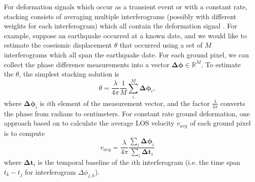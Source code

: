For deformation signals which occur as a transient event 
or with a constant rate, stacking consists of averaging multiple interferograms (possibly with different weights for each interferogram) which all contain the deformation signal \citep{Simons2007InterferometricSyntheticAperture, Zheng2019ImagingCascadiaSlow}. 
For example, suppose an earthquake occurred at a known date, and we would like to estimate the coseismic displacement $\theta$ that occurred using a set of $M$ interferograms which all span the earthquake date. For each ground pixel, we can collect the phase difference measurements into a vector $\bm{\Delta \phi} \in \mathbb{R}^{M} $.
To estimate the $\theta$, the simplest stacking solution is
\begin{equation}
	\theta = \frac{\lambda }{4 \pi} \frac{1}{M} \sum_i^M \bm{\Delta \phi}_i ,
	\label{eq:ch2-stacking-1}
\end{equation}
where $\bm{\Delta \phi}_i$ is $i$th element of the measurement vector, and the factor $  \frac{\lambda }{4 \pi} $ converts the phase from radians to centimeters.
For constant rate ground deformation, one approach based on \citep{Sandwell1998PhaseGradientApproach} to calculate the average LOS velocity $v_{avg}$ of each ground pixel is to compute
\begin{equation}
	v_{avg} = \frac{\lambda }{4 \pi} \frac{\sum_i \bm{\Delta \phi}_i}{\sum_i \bm{\Delta t}_i }
	\label{eq:ch2-stacking-2}
\end{equation}
where $ \bm{\Delta t}_i $ is the temporal baseline of the $i$th interferogram (i.e. the time span $t_k - t_j$  for interferogram $ \Delta \phi_{j, k} $). %




